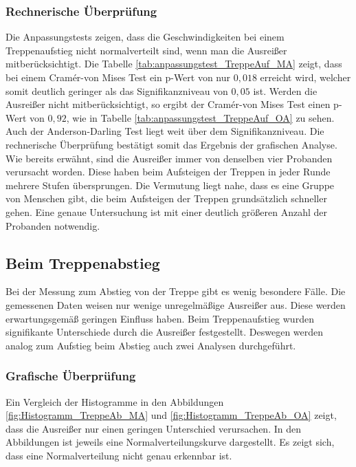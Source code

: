 	
	\subsubsection{Rechnerische Überprüfung}
	Die Anpassungstests zeigen, dass die Geschwindigkeiten bei einem Treppenaufstieg nicht normalverteilt sind, wenn man die Ausreißer mitberücksichtigt. Die Tabelle \ref{tab:anpassungstest_TreppeAuf_MA} zeigt, dass bei einem Cram{\' e}r-von Mises Test ein p-Wert von nur $0,018$ erreicht wird, welcher somit deutlich geringer als das Signifikanzniveau von $0,05$ ist. Werden die Ausreißer nicht mitberücksichtigt, so ergibt der Cram{\' e}r-von Mises Test einen p-Wert von $0,92$, wie in Tabelle \ref{tab:anpassungstest_TreppeAuf_OA} zu sehen. Auch der Anderson-Darling Test liegt weit über dem Signifikanzniveau. Die rechnerische Überprüfung bestätigt somit das Ergebnis der grafischen Analyse. Wie bereits erwähnt, sind die Ausreißer immer von denselben vier Probanden verursacht worden. Diese haben beim Aufsteigen der Treppen in jeder Runde mehrere Stufen übersprungen. Die Vermutung liegt nahe, dass es eine Gruppe von Menschen gibt, die beim Aufsteigen der Treppen grundsätzlich schneller gehen. Eine genaue Untersuchung ist mit einer deutlich größeren Anzahl der Probanden notwendig.
	
	
	\subsection{Beim Treppenabstieg}
	
	Bei der Messung zum Abstieg von der Treppe gibt es wenig besondere Fälle. Die gemessenen Daten weisen nur wenige unregelmäßige Ausreißer aus. Diese werden erwartungsgemäß geringen Einfluss haben. Beim Treppenaufstieg wurden signifikante Unterschiede durch 
	die Ausreißer festgestellt. Deswegen werden analog zum Aufstieg beim Abstieg auch zwei Analysen durchgeführt.
	
	
	
	\subsubsection{Grafische Überprüfung}
	Ein Vergleich der Histogramme in den Abbildungen \ref{fig:Histogramm_TreppeAb_MA} und \ref{fig:Histogramm_TreppeAb_OA} zeigt, dass die Ausreißer nur einen geringen Unterschied verursachen. In den Abbildungen ist jeweils eine Normalverteilungskurve dargestellt. Es zeigt sich, dass eine Normalverteilung nicht genau erkennbar ist.
	
